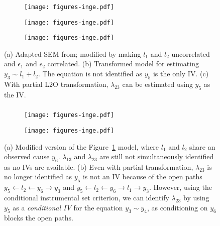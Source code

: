 \documentclass{beamer}
\begin{document}
\begin{frame}
	\frametitle{}
		\begin{figure}[t]
			\centering
			\begin{subfigure}[b]{0.33 \linewidth}
				\centering
				\texttt{[image: figures-inge.pdf]}
				\caption{}
				\label{fig:example_orig}
			\end{subfigure}%
			\begin{subfigure}[b]{0.33 \linewidth}
				\centering
				\texttt{[image: figures-inge.pdf]}
				\caption{}
				\label{fig:example_non_corr}
			\end{subfigure}%
			\begin{subfigure}[b]{0.33 \linewidth}
				\centering
				\texttt{[image: figures-inge.pdf]}
				\caption{}
				\label{fig:transform_non_corr}
			\end{subfigure}
			\caption{(a) Adapted SEM from; modified by making $ l_1
				 $ and $ l_2 $ uncorrelated and $ \epsilon_1 $ and $ \epsilon_2
				 $ correlated. (b) Transformed model for estimating $ y_3 \sim
				 l_1 + l_2 $. The equation is not identified as $ y_5 $ is the
				 only IV. (c) With partial L2O transformation, $ \lambda_{23} $
				 can be estimated using $ y_5 $ as the IV.}
		\label{fig:examples3}
		\end{figure}
\end{frame}

\begin{frame}
	\frametitle{}
	\begin{figure}[t]
		\centering
		\begin{subfigure}[b]{0.5 \linewidth}
			\centering
			\texttt{[image: figures-inge.pdf]}
			\caption{}
			\label{fig:example_conditional_iv}
		\end{subfigure}%
		\begin{subfigure}[b]{0.5 \linewidth}
			\centering
			\texttt{[image: figures-inge.pdf]}
			\caption{}
			\label{fig:transform_conditional_iv}
		\end{subfigure}
		\caption{(a) Modified version of the Figure~\ref{fig:example_orig} model, where $l_1$ and $l_2$
			share an observed cause $y_6$.
			$\lambda_{13} $ and $ \lambda_{23} $ are still not
			simultaneously identified as no IVs are available. (b) Even
			with partial transformation, $ \lambda_{23} $ is no longer
			identified as $ y_5 $ is not an IV because of the open paths $
			y_5 \gets l_2 \gets y_6 \to y_3 $ and $ y_5 \gets l_2 \gets y_6
			\to l_1 \to y_3 $. However, using the conditional instrumental
			set criterion, we can identify $\lambda_{23}$ by using $y_5$ as
			a \emph{conditional IV} for the equation $y_3 \sim y_4$, as
			conditioning on $ y_6 $ blocks the open paths.}
	\label{fig:examples4}
	\end{figure}
\end{frame}
\end{document}
